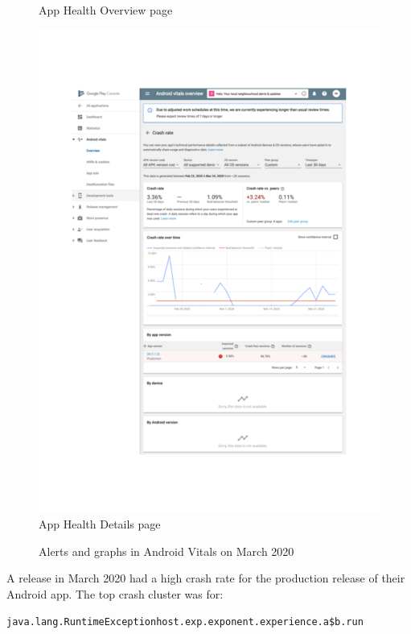 \begin{figure}[htbp!]
\begin{minipage}{.47\linewidth}
  {\footnotesize App Health Overview page}
\end{minipage}\hfill%
\begin{minipage}{.47\linewidth}
  \centering
  \includegraphics[width=\linewidth]{images/localhalo/apphealthdetailsplace_55505963_high_errors.pdf}
  {\footnotesize App Health Details page}
\end{minipage}
    \caption{Alerts and graphs in Android Vitals on  March 2020}
    \label{fig:localhalo-android-vitals-high-failures-26-march-2020}
\end{figure}

A release in March 2020 had a high crash rate for the production release of their Android app. The top crash cluster was for:

{\small \texttt{java.lang.RuntimeExceptionhost.exp.exponent.experience.a\$b.run}} 

